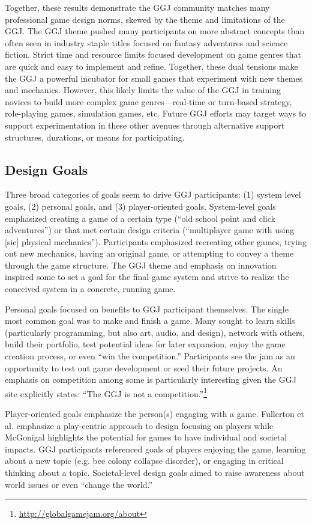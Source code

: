\documentclass{sig-alternate}
\begin{document}
Together, these results demonstrate the GGJ community matches many professional game design norms, skewed by the theme and limitations of the GGJ. The GGJ theme pushed many participants on more abstract concepts than often seen in industry staple titles focused on fantasy adventures and science fiction. Strict time and resource limits focused development on game genres that are quick and easy to implement and refine. Together, these dual tensions make the GGJ a powerful incubator for small games that experiment with new themes and mechanics. However, this likely limits the value of the GGJ in training novices to build more complex game genres---real-time or turn-based strategy, role-playing games, simulation games, etc. Future GGJ efforts may target ways to support experimentation in these other avenues through alternative support structures, durations, or means for participating.

\subsection{Design Goals}
Three broad categories of goals seem to drive GGJ participants: (1) system level goals, (2) personal goals, and (3) player-oriented goals.
System-level goals emphasized creating a game of a certain type (``old school point and click adventures'') or that met certain design criteria (``multiplayer game with using [sic] physical mechanics''). Participants emphasized recreating other games, trying out new mechanics, having an original game, or attempting to convey a theme through the game structure. The GGJ theme and emphasis on innovation inspired some to set a goal for the final game system and strive to realize the conceived system in a concrete, running game.

Personal goals focused on benefits to GGJ participant themselves. 
The single most common goal  was to make and finish a game. 
Many sought to learn skills (particularly programming, but also art, audio, and design), network with others, build their portfolio, test potential ideas for later expansion, enjoy the game creation process, or even ``win the competition.'' Participants see the jam as an opportunity to test out game development or seed their future projects. An emphasis on competition among some is particularly interesting given the GGJ site explicitly states: ``The GGJ is not a competition.''\footnote{\url{http://globalgamejam.org/about}}

Player-oriented goals emphasize the person(s) engaging with a game. Fullerton et al. \cite{fullerton2008:playcentric} emphasize a play-centric approach to design focusing on players while McGonigal \cite{mcgonigal2011:realitybroken} highlights the potential for games to have individual and societal impacts.
GGJ participants referenced goals of players enjoying the game, learning about a new topic (e.g. bee colony collapse disorder), or engaging in critical thinking about a topic. Societal-level design goals aimed to raise awareness about world issues or even ``change the world.''
\end{document}
